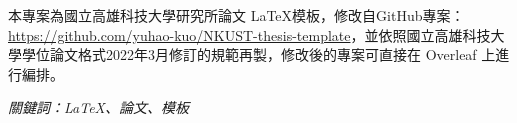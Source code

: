 \renewcommand{\abstractname}{摘要}
\clearpage
{}
\addchaptertocentry{\abstractname}
\begin{cntabstract}

本專案為國立高雄科技大學研究所論文 \LaTeX 模板，修改自GitHub專案：\url{https://github.com/yuhao-kuo/NKUST-thesis-template}，並依照國立高雄科技大學學位論文格式2022年3月修訂的規範再製，修改後的專案可直接在 Overleaf 上進行編排。

\hbox{}
\it 關鍵詞：LaTeX、論文、模板
\end{cntabstract}